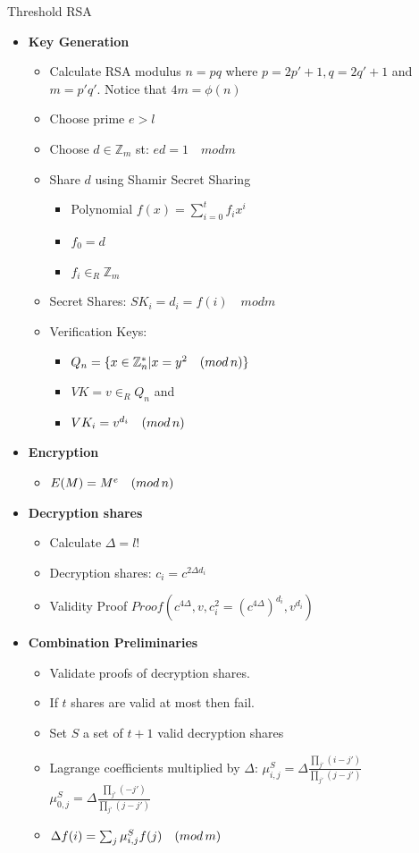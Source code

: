 \documentclass{beamer}
\begin{document}
\begin{frame}[allowframebreaks]{Threshold RSA \cite{Shoup:2000:PTS:1756169.1756190}}
\begin{itemize}
\item \textbf{Key Generation}
\begin{itemize}
\item Calculate RSA modulus $n = p  q$ where $p=2p'+1, q=2q'+1$ and $m=p'  q'$. Notice that $4  m = \phi(n)$
\item Choose prime $e>l$
\item Choose $d \in \mathbb{Z}_m$ st: $ e  d = 1 \quad mod m$
\item Share $d$ using Shamir Secret Sharing
\begin{itemize}
\item Polynomial $ f(x) = \sum_{i=0}^t f_i  x^i $
\item $f_0 = d$
\item $f_i \in_R \mathbb{Z}_m$
\end{itemize}
\item Secret Shares: $SK_i = d_i = f(i) \quad mod m$  
\item Verification Keys:
\begin{itemize}
\item $Q_n =  \{ x \in \mathbb{Z}_{n}^* | x=y^2 \quad (mod \, {n})  \} $
\item $VK = v \in_R Q_n$ and 
\item $VK_i = v^{d_i} \quad (mod \, {n}) $ 
\end{itemize}
\end{itemize}

\framebreak
\item \textbf{Encryption}
\begin{itemize}
\item $E(M) = M^e  \quad (mod \, {n})$
\end{itemize}
\item \textbf{Decryption shares}
\begin{itemize}
\item Calculate $\Delta = l!$
\item Decryption shares: $c_i = c^{2  \Delta  d_i} $
\item Validity Proof $Proof( c^{4  \Delta}, v, c_i^2 = (c^{4  \Delta})^{d_i}   , v^{d_i})$
\end{itemize}
\item \textbf{Combination Preliminaries}
\begin{itemize}
\item Validate proofs of decryption shares.
\item If $t$ shares are valid at most then fail.
\item Set $S$ a set of $t+1$ valid decryption shares
\item Lagrange coefficients multiplied by $\Delta$: 
$\mu^S_{i,j} = \Delta  \frac{\prod_{j'} (i-j')}{\prod_{j'} (j-j')}$
$\mu^S_{0,j} = \Delta  \frac{\prod_{j'} ( -j')}{\prod_{j'} (j-j')}$
\item $\Delta  f(i) = \sum_{j} \mu^S_{i,j}  f(j) \quad (mod \, {m})$
\end{itemize}


\end{itemize}
\end{frame}
\end{document}
